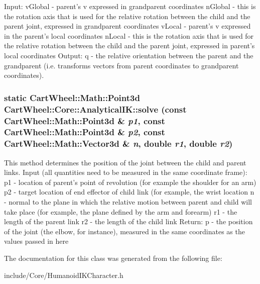 Input: vGlobal -\/ parent's v expressed in grandparent coordinates nGlobal -\/ this is the rotation axis that is used for the relative rotation between the child and the parent joint, expressed in grandparent coordinates vLocal -\/ parent's v expressed in the parent's local coordinates nLocal -\/ this is the rotation axis that is used for the relative rotation between the child and the parent joint, expressed in parent's local coordinates Output: q -\/ the relative orientation between the parent and the grandparent (i.e. transforms vectors from parent coordinates to grandparent coordinates). \hypertarget{classCartWheel_1_1Core_1_1AnalyticalIK_af59040c4461da6eb5d22b37ad6d6cc9b}{
\subsubsection[{solve}]{\setlength{\rightskip}{0pt plus 5cm}static {\bf CartWheel::Math::Point3d} CartWheel::Core::AnalyticalIK::solve (const {\bf CartWheel::Math::Point3d} \& {\em p1}, \/  const {\bf CartWheel::Math::Point3d} \& {\em p2}, \/  const {\bf CartWheel::Math::Vector3d} \& {\em n}, \/  double {\em r1}, \/  double {\em r2})}}
\label{classCartWheel_1_1Core_1_1AnalyticalIK_af59040c4461da6eb5d22b37ad6d6cc9b}
This method determines the position of the joint between the child and parent links. Input (all quantities need to be measured in the same coordinate frame): p1 -\/ location of parent's point of revolution (for example the shoulder for an arm) p2 -\/ target location of end effector of child link (for example, the wrist location n -\/ normal to the plane in which the relative motion between parent and child will take place (for example, the plane defined by the arm and forearm) r1 -\/ the length of the parent link r2 -\/ the length of the child link Return: p -\/ the position of the joint (the elbow, for instance), measured in the same coordinates as the values passed in here 

The documentation for this class was generated from the following file:\begin{DoxyCompactItemize}
\item 
include/Core/HumanoidIKCharacter.h\end{DoxyCompactItemize}
